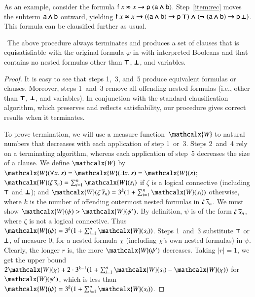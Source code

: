 \begin{rep}
As an example, consider the formula $\mathsf{f} \; x \mathrel{\pmb{\approx}} x \mathrel{\pmb{\rightarrow}} \mathsf{p} \;
(\mathsf{a} \pmb{\land} \mathsf{b})$. Step~\ref{item:rec} moves
the subterm $\mathsf{a} \pmb{\land} \mathsf{b}$ outward, yielding
  $\mathsf{f} \; x \mathrel{\pmb{\approx}} x \mathrel{\pmb{\rightarrow}}
    ((\mathsf{a} \pmb{\land} \mathsf{b}) \mathrel{\pmb{\rightarrow}} \mathsf{p} \>\pmb{\top})
    \mathrel{\pmb{\land}}
    ({\pmb{\neg\,}}\,(\mathsf{a} \pmb{\land} \mathsf{b}) \mathrel{\pmb{\rightarrow}} \mathsf{p} \>\pmb{\bot})$.
This formula can be clausified further as usual.

\begin{sloppypar}
\begin{theorem}\,%
The above procedure always terminates and produces a set of clauses that is
equisatisfiable with the original formula $\varphi$ in \lfhol{} with
interpreted Booleans and that contains no nested formulas other than
$\pmb{\top}$, $\pmb{\bot}$, and variables.
\end{theorem}
\end{sloppypar}

\newcommand{\tmeasure}{\ensuremath{\mathcalx{W}}}

\begin{proof}
It is easy to see that steps 1,~3, and~5
produce equivalent formulas or clauses. Moreover, steps 1~and~3 remove all
offending nested formulas (i.e., other than $\pmb{\top}$,
$\pmb{\bot}$, and variables). In conjunction with the standard
clausification algorithm, which preserves and reflects satisfiability, our
procedure gives correct results when it terminates.

To prove termination, we will use a measure function~$\tmeasure$ to natural
numbers that decreases with each application of step 1~or~3.
Steps 2~and~4 rely on a terminating algorithm, whereas each
application of step~5 decreases the size of a clause. We define $\tmeasure$ by
$\tmeasure(\forall x. \> s) = \tmeasure(\exists x. \> s) = \tmeasure(s)$;
$\tmeasure(\zeta \, \tuple{s}{n}) = \sum_{i=1}^{n}{\tmeasure(s_i)}$ if
$\zeta$ is a logical connective (including $\pmb{\top}$ and
$\pmb{\bot}$); and $\tmeasure(\zeta \, \tuple{s}{n}) = 3^k (1 +
\sum_{i=1}^{n}{\tmeasure(s_i)})$ otherwise, where
$k$ is the number of offending outermost nested formulas in $\zeta \, \overline{s}_{n}$.
We must show $\tmeasure(\psi) > \tmeasure(\psi')$. By definition,
$\psi$ is of the form $\zeta \,
\overline{s}_{n}$, where $\zeta$ is not a logical connective.
Thus $\tmeasure(\psi) = 3^k (1 +
\sum_{i=1}^{n}{\tmeasure(s_i)})$. Steps 1~and~3 substitute
$\pmb{\top}$ or $\pmb{\bot}$, of measure 0, for a nested formula $\chi$
(including $\chi$'s own nested formulas) in $\psi$.
Clearly, the longer $r$ is, the more $\tmeasure(\psi')$
decreases. Taking $\left|r\right|=1$, we get the upper bound $2 \tmeasure(\chi)
+ 2 \cdot 3^{k-1} (1 + \sum_{i=1}^{n}\tmeasure(s_i) - \tmeasure(\chi))$ for
$\tmeasure(\psi')$, which is less than $\tmeasure(\psi) = 3^k (1 +
\sum_{i=1}^{n}{\tmeasure(s_i)})$.
\end{proof}


\end{rep}
